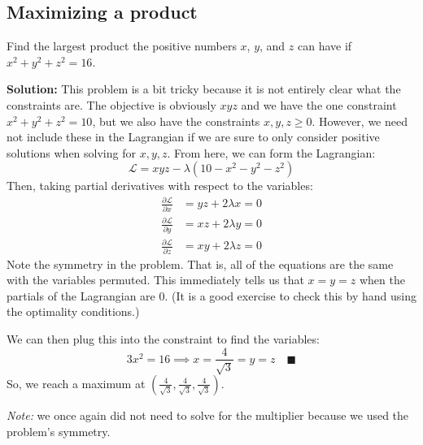 \documentclass[letterpaper, 11pt]{article}
\begin{document}
\subsection{Maximizing a product} Find the largest product the positive numbers $x$, $y$, and $z$ can have if $x^2 + y^2 + z^2 = 16$.
\par \textbf{Solution:} This problem is a bit tricky because it is not entirely clear what the constraints are. The objective is obviously $xyz$ and we have the one constraint $x^2 + y^2 + z^2 = 10$, but we also have the constraints $x,y,z \geq 0$. However, we need not include these in the Lagrangian if we are sure to only consider positive solutions when solving for $x,y,z$. From here, we can form the Lagrangian:
\[ \mathcal{L} = xyz - \lambda(10 - x^2 - y^2 - z^2)  \]
Then, taking partial derivatives with respect to the variables:
\begin{align*}
\frac{\partial \mathcal{L}}{\partial x} &= yz + 2 \lambda x = 0\\
\frac{\partial \mathcal{L}}{\partial y} &= xz + 2 \lambda y = 0\\
\frac{\partial \mathcal{L}}{\partial z} &= xy + 2 \lambda z = 0
\end{align*}
Note the symmetry in the problem. That is, all of the equations are the same with the variables permuted. This immediately tells us that $x = y = z$ when the partials of the Lagrangian are 0. (It is a good exercise to check this by hand using the optimality conditions.)
\par We can then plug this into the constraint to find the variables:
\[ 3x^2 = 16 \implies x = \frac{4}{\sqrt{3}} = y = z \quad\blacksquare \]
So, we reach a maximum at $\left( \frac{4}{\sqrt{3}} ,\frac{4}{\sqrt{3}} ,\frac{4}{\sqrt{3}} \right)$. 
\par \textit{Note:} we once again did not need to solve for the multiplier because we used the problem's symmetry. 
\end{document}
